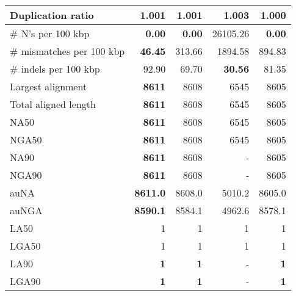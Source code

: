\documentclass[12pt,a4paper]{article}
\begin{document}
\begin{table}[ht]
\begin{center}
\begin{tabular}{|l*{4}{|r}|}
Duplication ratio & 1.001 & 1.001 & 1.003 & {\bf 1.000} \\ \hline
\# N's per 100 kbp & {\bf 0.00} & {\bf 0.00} & 26105.26 & {\bf 0.00} \\ \hline
\# mismatches per 100 kbp & {\bf 46.45} & 313.66 & 1894.58 & 894.83 \\ \hline
\# indels per 100 kbp & 92.90 & 69.70 & {\bf 30.56} & 81.35 \\ \hline
Largest alignment & {\bf 8611} & 8608 & 6545 & 8605 \\ \hline
Total aligned length & {\bf 8611} & 8608 & 6545 & 8605 \\ \hline
NA50 & {\bf 8611} & 8608 & 6545 & 8605 \\ \hline
NGA50 & {\bf 8611} & 8608 & 6545 & 8605 \\ \hline
NA90 & {\bf 8611} & 8608 & - & 8605 \\ \hline
NGA90 & {\bf 8611} & 8608 & - & 8605 \\ \hline
auNA & {\bf 8611.0} & 8608.0 & 5010.2 & 8605.0 \\ \hline
auNGA & {\bf 8590.1} & 8584.1 & 4962.6 & 8578.1 \\ \hline
LA50 & 1 & 1 & 1 & 1 \\ \hline
LGA50 & 1 & 1 & 1 & 1 \\ \hline
LA90 & {\bf 1} & {\bf 1} & - & {\bf 1} \\ \hline
LGA90 & {\bf 1} & {\bf 1} & - & {\bf 1} \\ \hline
\end{tabular}
\end{center}
\end{table}
\end{document}
